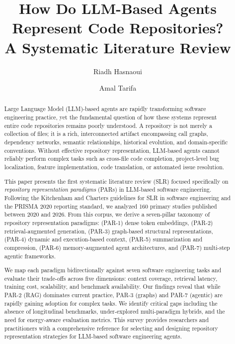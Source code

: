 \documentclass[acmsmall,review]{acmart}
\newcommand{\parcmd}[1]{\textsc{PAR-#1}\xspace}
\begin{document}
\title{How Do LLM-Based Agents Represent Code Repositories?\\A Systematic Literature Review}

\author{Riadh Hasnaoui}

\author{Amal Tarifa}

\begin{abstract}
Large Language Model (LLM)-based agents are rapidly transforming software engineering practice,
yet the fundamental question of how these systems represent entire code repositories remains
poorly understood. A repository is not merely a collection of files; it is a rich, interconnected
artifact encompassing call graphs, dependency networks, semantic relationships, historical
evolution, and domain-specific conventions. Without effective repository representation,
LLM-based agents cannot reliably perform complex tasks such as cross-file code completion,
project-level bug localization, feature implementation, code translation, or automated issue
resolution.

This paper presents the first systematic literature review (SLR) focused specifically on
\emph{repository representation paradigms} (PARs) in LLM-based software engineering.
Following the Kitchenham and Charters guidelines for SLR in software engineering and the
PRISMA 2020 reporting standard, we analyzed 160 primary studies published between 2020 and
2026. From this corpus, we derive a seven-pillar taxonomy of repository representation
paradigms: (\parcmd{1}) dense token embeddings, (\parcmd{2}) retrieval-augmented generation,
(\parcmd{3}) graph-based structural representations, (\parcmd{4}) dynamic and execution-based
context, (\parcmd{5}) summarization and compression, (\parcmd{6}) memory-augmented agent
architectures, and (\parcmd{7}) multi-step agentic frameworks.

We map each paradigm bidirectionally against seven software engineering tasks and evaluate
their trade-offs across five dimensions: context coverage, retrieval latency, training cost,
scalability, and benchmark availability. Our findings reveal that while \parcmd{2} (RAG)
dominates current practice, \parcmd{3} (graphs) and \parcmd{7} (agentic) are rapidly gaining
adoption for complex tasks. We identify critical gaps including the absence of longitudinal
benchmarks, under-explored multi-paradigm hybrids, and the need for energy-aware evaluation
metrics. This survey provides researchers and practitioners with a comprehensive reference for
selecting and designing repository representation strategies for LLM-based software engineering
agents.
\end{abstract}
\end{document}
